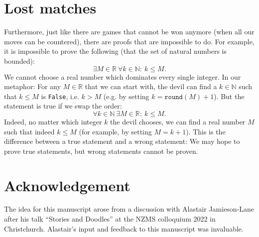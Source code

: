 \documentclass[11pt]{article}
\theoremstyle{plain}
\theoremstyle{definition}
\theoremstyle{remark}
\numberwithin{equation}{section}
\newcommand{\R}{\mathbb{R}}
\newcommand{\N}{\mathbb N}
\begin{document}
\section{Lost matches}
Furthermore, just like there are games that cannot be won anymore (when all our moves can be countered), there are proofs that are impossible to do. For example, it is impossible to prove the following (that the set of natural numbers is bounded):
\[\exists M\in \R~ \forall k\in \N: ~ k \leq M.\]
We cannot choose a real number which dominates every single integer. In our metaphor: For any $M\in \R$ that we can start with, the devil can find a $k\in \N$ such that $k \leq M$ is \texttt{False}, i.e. $k > M$ (e.g. by setting $k = \texttt{round}(M)+1$). But the statement is true if we swap the order:
\[\forall k\in \N~ \exists M\in \R:~ k\leq M.\]
Indeed, no matter which integer $k$ the devil chooses, we can find a real number $M$ such that indeed $k\leq M$ (for example, by setting $M = k + 1$). This is the difference between a true statement and a wrong statement: We may hope to prove true statements, but wrong statements cannot be proven.

\section*{Acknowledgement}
The idea for this manuscript arose from a discussion with Alastair Jamieson-Lane after his talk ``Stories and Doodles'' at the NZMS colloquium 2022 in Christchurch. Alastair's input and feedback to this manuscript was invaluable.


\end{document}
